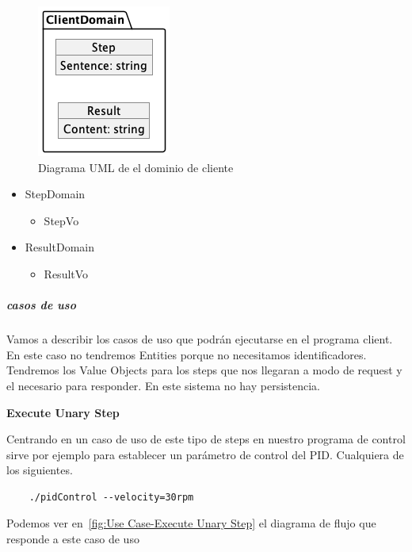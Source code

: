 \begin{figure}[H]
    \centering
    \includegraphics[height=0.2\textheight]{./part/Proyecto_ejecutivo/memoria_descriptiva/descripcionDelProyecto/client/uml/clientDomain}
    \caption{Diagrama UML de el dominio de cliente}\label{fig:Diagrama UML de el dominio de cliente}
\end{figure}

\begin{itemize}
    \item StepDomain
    \begin{itemize}
        \item StepVo
    \end{itemize}
    \item ResultDomain
    \begin{itemize}
        \item ResultVo
    \end{itemize}
\end{itemize}

\subparagraph{casos de uso}

Vamos a describir los casos de uso que podrán ejecutarse en el programa client. En este caso no tendremos Entities porque no necesitamos identificadores.
Tendremos los Value Objects para los steps que nos llegaran a modo de request y el necesario para responder. En este sistema no hay persistencia.

\textbf{Execute Unary Step}

Centrando en un caso de uso de este tipo de steps en nuestro programa de control sirve por ejemplo para establecer un parámetro de control del PID. Cualquiera de los siguientes.
\begin{verbatim}
    ./pidControl --velocity=30rpm
\end{verbatim}

Podemos ver en~\ref{fig:Use Case-Execute Unary Step} el diagrama de flujo que responde a este caso de uso

